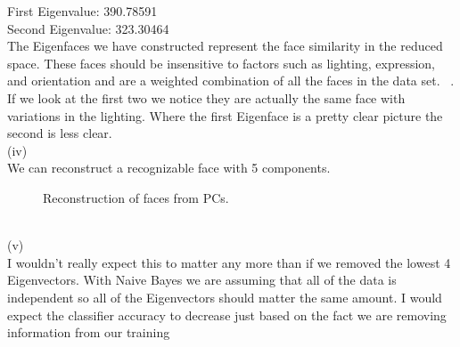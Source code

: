 \documentclass{report}
\begin{document}
First Eigenvalue: 390.78591\\
Second Eigenvalue: 323.30464\\
The Eigenfaces we have constructed represent the face similarity in
the reduced space. These faces should be insensitive to factors such
as lighting, expression, and orientation and are a weighted
combination of all the faces in the data set. ~\cite{PCA}. If we look
at the first two we notice they are actually the same face with
variations in the lighting. Where the first Eigenface is a pretty
clear picture the second is less clear.\\
(iv)\\
We can reconstruct a recognizable face with 5 components.\\
\begin{figure}[h]
  \centering
  \caption{Reconstruction of faces from PCs.}
  \label{fig}
\end{figure}\\
(v)\\
I wouldn't really expect this to matter any more than if we removed
the lowest 4 Eigenvectors. With Naive Bayes we are assuming that all
of the data is independent so all of the Eigenvectors should matter
the same amount. I would expect the classifier accuracy to decrease
just based on the fact we are removing information from our training
\end{document}
